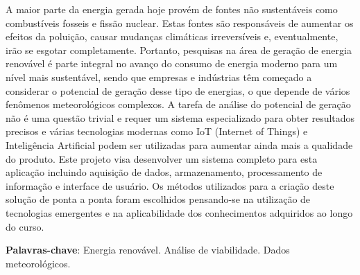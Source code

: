 \documentclass[../../layout.tex]{subfiles}
\begin{document}
\begin{resumo}
\hspace*{3em}
A maior parte da energia gerada hoje provém de fontes não sustentáveis como combustíveis fosseis e fissão nuclear. Estas fontes são responsáveis de aumentar os efeitos da poluição, causar mudanças climáticas irreversíveis e, eventualmente, irão se esgotar completamente. Portanto, pesquisas na área de geração de energia renovável é parte integral no avanço do consumo de energia moderno para um nível mais sustentável, sendo que empresas e indústrias têm começado a considerar o potencial de geração desse tipo de energias, o que depende de vários fenômenos meteorológicos complexos. A tarefa de análise do potencial de geração não é uma questão trivial e requer um sistema especializado para obter resultados precisos e várias tecnologias modernas como IoT (Internet of Things) e Inteligência Artificial podem ser utilizadas para aumentar ainda mais a qualidade do produto. Este projeto visa desenvolver um sistema completo para esta aplicação incluindo aquisição de dados, armazenamento, processamento de informação e interface de usuário. Os métodos utilizados para a criação deste solução de ponta a ponta foram escolhidos pensando-se na utilização de tecnologias emergentes e na aplicabilidade dos conhecimentos adquiridos ao longo do curso.
\vspace{\onelineskip}

\noindent
\textbf{Palavras-chave}: Energia renovável. Análise de viabilidade. Dados meteorológicos.
\end{resumo}
\end{document}
